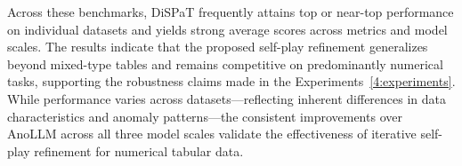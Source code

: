 Across these benchmarks, DiSPaT frequently attains top or near-top performance on 
individual datasets and yields strong average scores across metrics and model scales. 
The results indicate that the proposed self-play refinement generalizes beyond 
mixed-type tables and remains competitive on predominantly numerical tasks, supporting 
the robustness claims made in the Experiments~\ref{4:experiments}. While performance varies across datasets—reflecting inherent differences in data characteristics and anomaly patterns—the consistent improvements over AnoLLM across all three model scales validate the effectiveness of iterative self-play refinement for numerical tabular data.

\newcommand{\best}[1]{\textcolor{red}{\textbf{#1}}}
\newcommand{\second}[1]{\textcolor{blue}{\textbf{#1}}}

